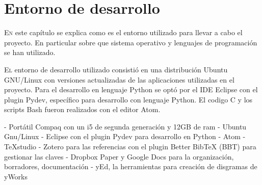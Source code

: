 
\chapter{Entorno de desarrollo}
\label{chap:entorno-desarrollo}

\lettrine{E}n este capítulo se explica como es el entorno utilizado para llevar a cabo el proyecto. En particular sobre que sistema operativo y lenguajes de programación se han utilizado.

\lettrine{E}{l} entorno de desarrollo utilizado consistió en una distribución Ubuntu GNU/Linux con versiones actualizadas de las aplicaciones utilizadas en el proyecto. Para el desarrollo en lenguaje Python se optó por el IDE Eclipse con el plugin Pydev, específico para desarrollo con lenguaje Python. El codigo C y los scripts Bash fueron realizados con el editor Atom.

- Portátil Compaq con un i5 de segunda generación y 12GB de ram
- Ubuntu Gnu/Linux
- Eclipse con el plugin Pydev para desarrollo en Python
- Atom
- TeXstudio
- Zotero para las referencias con el plugin Better BibTeX (BBT) para gestionar las claves
- Dropbox Paper y Google Docs para la organización, borradores, documentación
- yEd, la herramientas para creación de disgramas de yWorks

